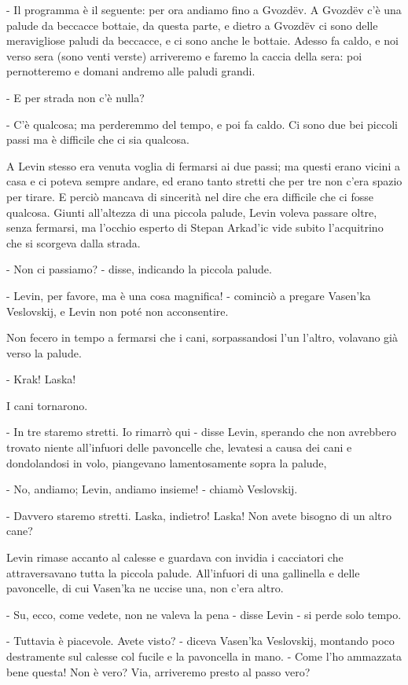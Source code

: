 - Il programma è il seguente: per ora andiamo fino a Gvozdëv. A Gvozdëv c'è una palude da beccacce bottaie, da questa parte, e dietro a Gvozdëv ci sono delle meravigliose paludi da beccacce, e ci sono anche le bottaie. Adesso fa caldo, e noi verso sera (sono venti verste) arriveremo e faremo la caccia della sera: poi pernotteremo e domani andremo alle paludi grandi. 

- E per strada non c'è nulla? 

- C'è qualcosa; ma perderemmo del tempo, e poi fa caldo. Ci sono due bei piccoli passi ma è difficile che ci sia qualcosa. 

A Levin stesso era venuta voglia di fermarsi ai due passi; ma questi erano vicini a casa e ci poteva sempre andare, ed erano tanto stretti che per tre non c'era spazio per tirare. E perciò mancava di sincerità nel dire che era difficile che ci fosse qualcosa. Giunti all'altezza di una piccola palude, Levin voleva passare oltre, senza fermarsi, ma l'occhio esperto di Stepan Arkad'ic vide subito l'acquitrino che si scorgeva dalla strada. 

- Non ci passiamo? - disse, indicando la piccola palude. 

- Levin, per favore, ma è una cosa magnifica! - cominciò a pregare Vasen'ka Veslovskij, e Levin non poté non acconsentire. 

Non fecero in tempo a fermarsi che i cani, sorpassandosi l'un l'altro, volavano già verso la palude. 

- Krak! Laska! 

I cani tornarono. 

- In tre staremo stretti. Io rimarrò qui - disse Levin, sperando che non avrebbero trovato niente all'infuori delle pavoncelle che, levatesi a causa dei cani e dondolandosi in volo, piangevano lamentosamente sopra la palude, 

- No, andiamo; Levin, andiamo insieme! - chiamò Veslovskij. 

- Davvero staremo stretti. Laska, indietro! Laska! Non avete bisogno di un altro cane? 

Levin rimase accanto al calesse e guardava con invidia i cacciatori che attraversavano tutta la piccola palude. All'infuori di una gallinella e delle pavoncelle, di cui Vasen'ka ne uccise una, non c'era altro. 

- Su, ecco, come vedete, non ne valeva la pena - disse Levin - si perde solo tempo. 

- Tuttavia è piacevole. Avete visto? - diceva Vasen'ka Veslovskij, montando poco destramente sul calesse col fucile e la pavoncella in mano. - Come l'ho ammazzata bene questa! Non è vero? Via, arriveremo presto al passo vero? 

